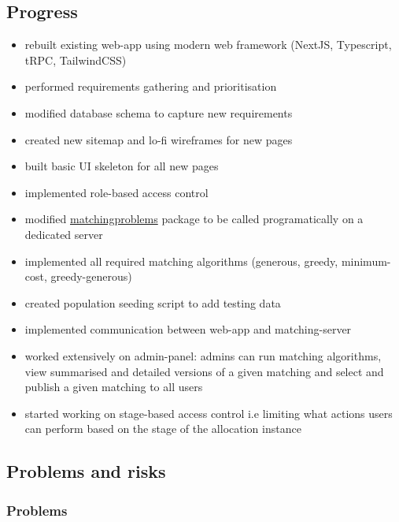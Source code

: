 \documentclass[11pt]{article}
\begin{document}
\subsection{Progress}\label{progress}

\begin{itemize}
    \item rebuilt existing web-app using modern web framework (NextJS, Typescript, tRPC, TailwindCSS)
    \item performed requirements gathering and prioritisation
    \item modified database schema to capture new requirements
    \item created new sitemap and lo-fi wireframes for new pages
    \item built basic UI skeleton for all new pages
    \item implemented role-based access control
    \item modified \href{https://github.com/fmcooper/matchingproblems}{matchingproblems} package to be called programatically on a dedicated server
    \item implemented all required matching algorithms (generous, greedy, minimum-cost, greedy-generous)
    \item created population seeding script to add testing data
    \item implemented communication between web-app and matching-server
    \item worked extensively on admin-panel: admins can run matching algorithms, view summarised and detailed versions of a given matching and select and publish a given matching to all users
    \item started working on stage-based access control i.e limiting what actions users can perform based on the stage of the allocation instance
\end{itemize}


\subsection{Problems and risks}\label{problems-and-risks}

\subsubsection{Problems}\label{problems}
\end{document}
